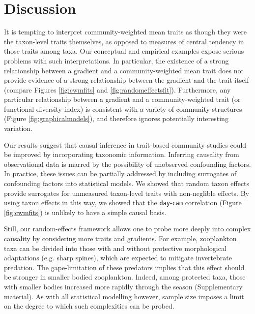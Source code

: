 \documentclass[12pt]{ecology}
\begin{document}
\section{Discussion}

It is tempting to interpret community-weighted mean traits as though they were the taxon-level traits themselves, as opposed to measures of central tendency in those traits among taxa.  Our conceptual and empirical examples expose serious problems with such interpretations.  In particular, the existence of a strong relationship between a gradient and a community-weighted mean trait does not provide evidence of a strong relationship between the gradient and the trait itself (compare Figures \ref{fig:cwmfits} and \ref{fig:randomeffectsfit}).  Furthermore, any particular relationship between a gradient and a community-weighted trait (or functional diversity index) is consistent with a variety of community structures (Figure \ref{fig:graphicalmodels}), and therefore ignores potentially interesting variation.

Our results suggest that causal inference in trait-based community studies could be improved by incorporating taxonomic information.  Inferring causality from observational data is marred by the possibility of unobserved confounding factors.  In practice, these issues can be partially addressed by including surrogates of confounding factors into statistical models.  We showed that random taxon effects provide surrogates for unmeasured taxon-level traits with non-neglible effects.  By using taxon effects in this way, we showed that the \texttt{day}-\texttt{cwm} correlation (Figure \ref{fig:cwmfits}) is unlikely to have a simple causal basis.

Still, our random-effects framework allows one to probe more deeply into complex causality by considering more traits and gradients.  For example, zooplankton taxa can be divided into those with and without protective morphological adaptations (e.g. sharp spines), which are expected to mitigate invertebrate predation.  The gape-limitation of these predators implies that this effect should be stronger in smaller bodied zooplankton.  Indeed, among protected taxa, those with smaller bodies increased more rapidly through the season (Supplementary material).  As with all statistical modelling however, sample size imposes a limit on the degree to which such complexities can be probed.


\end{document}
